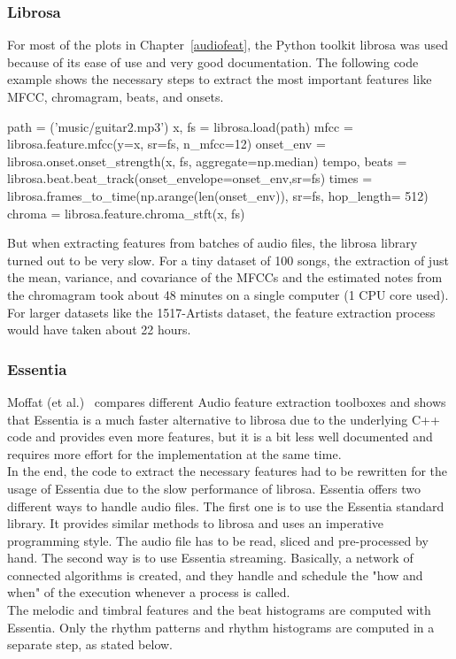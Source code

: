 \subsubsection{Librosa}

For most of the plots in Chapter~\ref{audiofeat}, the Python toolkit librosa was used because of its ease of use and very good documentation. The following code example shows the necessary steps to extract the most important features like MFCC, chromagram, beats, and onsets.
\lstset{language=Python} 
\begin{pythonCode}[frame=single,label={lst:Librosa},caption={Librosa},captionpos=b]
path = ('music/guitar2.mp3')
x, fs = librosa.load(path)
mfcc = librosa.feature.mfcc(y=x, sr=fs, n_mfcc=12)
onset_env = librosa.onset.onset_strength(x, fs, aggregate=np.median)
tempo, beats = librosa.beat.beat_track(onset_envelope=onset_env,sr=fs)
times = librosa.frames_to_time(np.arange(len(onset_env)), sr=fs, hop_length= 512)
chroma = librosa.feature.chroma_stft(x, fs)
\end{pythonCode}	
But when extracting features from batches of audio files, the librosa library turned out to be very slow. For a tiny dataset of 100 songs, the extraction of just the mean, variance, and covariance of the MFCCs and the estimated notes from the chromagram took about 48 minutes on a single computer (1 CPU core used). 
For larger datasets like the 1517-Artists dataset, the feature extraction process would have taken about 22 hours. 

\subsubsection{Essentia}

Moffat (et al.)~\cite{audiofeattoolb} compares different Audio feature extraction toolboxes and shows that Essentia is a much faster alternative to librosa due to the underlying C++ code and provides even more features, but it is a bit less well documented and requires more effort for the implementation at the same time.\\ 
In the end, the code to extract the necessary features had to be rewritten for the usage of Essentia due to the slow performance of librosa. Essentia offers two different ways to handle audio files. The first one is to use the Essentia standard library. It provides similar methods to librosa and uses an imperative programming style. The audio file has to be read, sliced and pre-processed by hand. The second way is to use Essentia streaming. Basically, a network of connected algorithms is created, and they handle and schedule the "how and when" of the execution whenever a process is called. \\
The melodic and timbral features and the beat histograms are computed with Essentia. Only the rhythm patterns and rhythm histograms are computed in a separate step, as stated below. 

